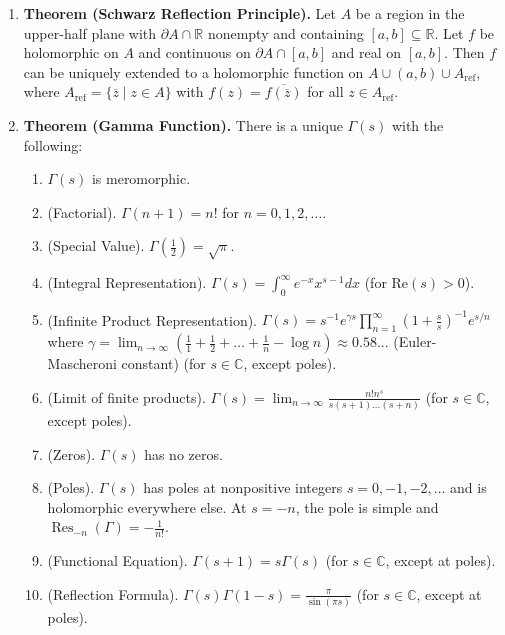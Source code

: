\documentclass[12pt]{article}
\theoremstyle{definition}
\theoremstyle{named}
\DeclareMathOperator{\Res}{Res}
\begin{document}
{\begin{multicols}{2}
\begin{spacing}{1.01}
\begin{enumerate}
    \item \textbf{Theorem (Schwarz Reflection Principle). } Let $A$ be a region in the upper-half plane with $\partial A \cap \mathbb{R}$ nonempty and containing $[a,b] \subseteq \mathbb{R}$. Let $f$ be holomorphic on $A$ and continuous on $\partial A \cap [a,b]$ and real on $[a,b]$. Then $f$ can be uniquely extended to a holomorphic function on $A \cup (a,b) \cup A_{\textrm{ref}}$, where $A_{\textrm{ref}} = \{\overline{z} \mid z \in A\}$ with $f(z) = \overline{f(\overline{z})}$ for all $z \in A_{\textrm{ref}}$. 
    \item \textbf{Theorem (Gamma Function). } There is a unique $\Gamma(s)$ with the following: 
    \begin{enumerate}
        \item $\Gamma(s)$ is meromorphic. 
        \item (Factorial). $\Gamma(n+1) = n!$ for $n=0,1,2,\dots$. 
        \item (Special Value). $\Gamma(\frac{1}{2}) = \sqrt{\pi}$. 
        \item (Integral Representation). $\Gamma(s) = \int_{0}^{\infty} e^{-x} x^{s-1} dx$ (for $\textrm{Re}(s) > 0$). 
        \item (Infinite Product Representation). $\Gamma(s) = s^{-1}e^{\gamma s} \prod_{n=1}^{\infty} \left(1 + \frac{s}{s}\right)^{-1} e^{s/n}$ where $\gamma = \lim_{n \to \infty} \left(\frac{1}{1} + \frac{1}{2} + \dots + \frac{1}{n} - \log n\right) \approx 0.58...$ (Euler-Mascheroni constant) (for $s \in \mathbb{C}$, except poles). 
        \item (Limit of finite products). $\Gamma(s) = \lim_{n \to \infty} \frac{n! n^s}{s(s+1)\dots(s+n)}$ (for $s \in \mathbb{C}$, except poles). 
        \item (Zeros). $\Gamma(s)$ has no zeros. 
        \item (Poles). $\Gamma(s)$ has poles at nonpositive integers $s=0,-1,-2,\dots$ and is holomorphic everywhere else. At $s=-n$, the pole is simple and $\Res_{-n}(\Gamma) = -\frac{1}{n!}$. 
        \item (Functional Equation). $\Gamma(s+1) = s\Gamma(s)$ (for $s \in \mathbb{C}$, except at poles). 
        \item (Reflection Formula). $\Gamma(s)\Gamma(1-s) = \frac{\pi}{\sin(\pi s)}$ (for $s \in \mathbb{C}$, except at poles). 
        

\end{enumerate}
\end{enumerate}
\end{spacing}
\end{multicols}}
\end{document}
